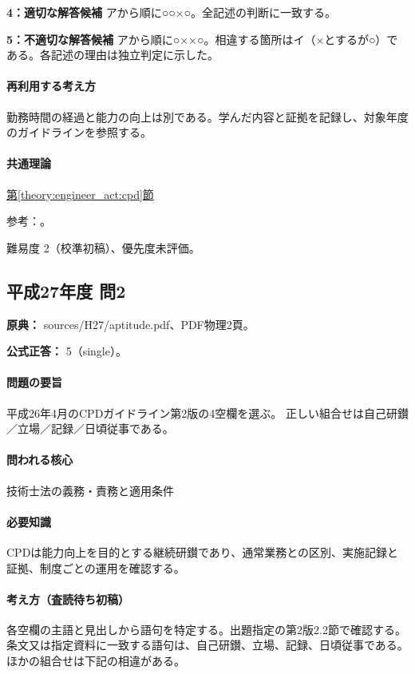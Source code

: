 \noindent\textbf{4：適切な解答候補} アから順に○○×○。全記述の判断に一致する。\par

\noindent\textbf{5：不適切な解答候補} アから順に○××○。相違する箇所はイ（×とするが○）である。各記述の理由は独立判定に示した。\par

\paragraph{再利用する考え方} 勤務時間の経過と能力の向上は別である。学んだ内容と証拠を記録し、対象年度のガイドラインを参照する。

\paragraph{共通理論} \hyperref[theory:engineer_act:cpd]{第\ref*{theory:engineer_act:cpd}節}

\par 参考：\cite{cpd_v1}。

\par 難易度 2（校準初稿）、優先度未評価。

\subsection{平成27年度 問2}
\label{q:h27-reg-apt-02}

\noindent\textbf{原典：} sources/H27/aptitude.pdf、PDF物理2頁。

\textbf{公式正答：} 5（single）。

\paragraph{問題の要旨} 平成26年4月のCPDガイドライン第2版の4空欄を選ぶ。 正しい組合せは自己研鑚／立場／記録／日頃従事である。

\paragraph{問われる核心} 技術士法の義務・責務と適用条件

\paragraph{必要知識} CPDは能力向上を目的とする継続研鑚であり、通常業務との区別、実施記録と証拠、制度ごとの運用を確認する。

\paragraph{考え方（査読待ち初稿）} 各空欄の主語と見出しから語句を特定する。出題指定の第2版2.2節で確認する。 条文又は指定資料に一致する語句は、自己研鑚、立場、記録、日頃従事である。ほかの組合せは下記の相違がある。

